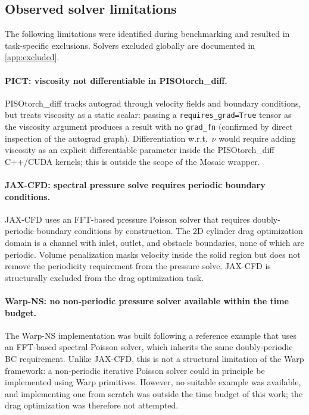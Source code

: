 \documentclass{article}
\begin{document}
\subsection{Observed solver limitations}
\label{app:solver-issues}

The following limitations were identified during benchmarking and resulted
in task-specific exclusions. Solvers excluded globally are documented in
\cref{app:excluded}.

\paragraph{PICT: viscosity not differentiable in PISOtorch\_diff.}
PISOtorch\_diff tracks autograd through velocity fields and boundary
conditions, but treats viscosity as a static scalar: passing a
\texttt{requires\_grad=True} tensor as the viscosity argument produces a
result with no \texttt{grad\_fn} (confirmed by direct inspection of the
autograd graph). Differentiation w.r.t.\ $\nu$ would require adding
viscosity as an explicit differentiable parameter inside the PISOtorch\_diff
C++/CUDA kernels; this is outside the scope of the Mosaic wrapper.

\paragraph{JAX-CFD: spectral pressure solve requires periodic boundary conditions.}
JAX-CFD uses an FFT-based pressure Poisson solver that requires doubly-periodic
boundary conditions by construction. The 2D cylinder drag optimization
domain is a channel with inlet, outlet, and obstacle boundaries, none of
which are periodic. Volume penalization masks velocity inside the solid
region but does not remove the periodicity requirement from the pressure
solve. JAX-CFD is structurally excluded from the drag optimization task.

\paragraph{Warp-NS: no non-periodic pressure solver available within the time budget.}
The Warp-NS implementation was built following a reference example that uses an
FFT-based spectral Poisson solver, which inherits the same doubly-periodic BC
requirement. Unlike JAX-CFD, this is not a structural limitation of the Warp
framework: a non-periodic iterative Poisson solver could in principle be
implemented using Warp primitives. However, no suitable example was available,
and implementing one from scratch was outside the time budget of this work;
the drag optimization was therefore not attempted.
\end{document}
